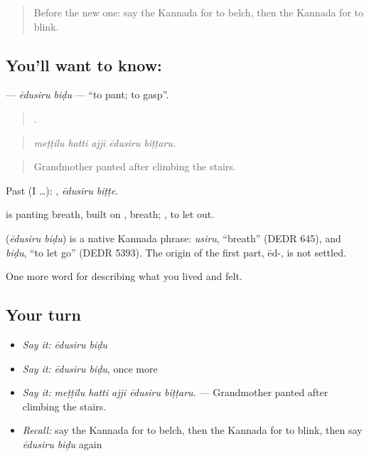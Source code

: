 \label{lesson:KA-C507-edusiru-bidu}



\begin{quote}
Before the new one: say the Kannada for to belch, then the Kannada for to blink.
\end{quote}

\subsection*{You'll want to know:  }
\textbf{ } — \emph{ēdusiru biḍu} — \textquotedblleft{}to pant; to gasp\textquotedblright{}.

\begin{quote}
    .
\end{quote}

\begin{quote}
\emph{meṭṭilu hatti ajji ēdusiru biṭṭaru.}
\end{quote}

\begin{quote}
Grandmother panted after climbing the stairs.
\end{quote}

Past (I …):  , \emph{ēdusiru biṭṭe}.

 is panting breath, built on , breath; , to let out.

\begin{cousinweb}
\textbf{ } (\emph{ēdusiru biḍu}) is a native Kannada phrase: \emph{usiru}, \textquotedblleft{}breath\textquotedblright{} (DEDR 645), and \emph{biḍu}, \textquotedblleft{}to let go\textquotedblright{} (DEDR 5393). The origin of the first part, ēd-, is not settled.
\end{cousinweb}

\begin{grammarlens}[title={What you've built}]
One more word for describing what you lived and felt.
\end{grammarlens}

\subsection*{Your turn}
\begin{itemize}
\raggedright
  \item \emph{Say it:} \emph{ēdusiru biḍu}
  \item \emph{Say it:} \emph{ēdusiru biḍu}, once more
  \item \emph{Say it:} \emph{meṭṭilu hatti ajji ēdusiru biṭṭaru.} — Grandmother panted after climbing the stairs.
  \item \emph{Recall:} say the Kannada for to belch, then the Kannada for to blink, then say \emph{ēdusiru biḍu} again
\end{itemize}

